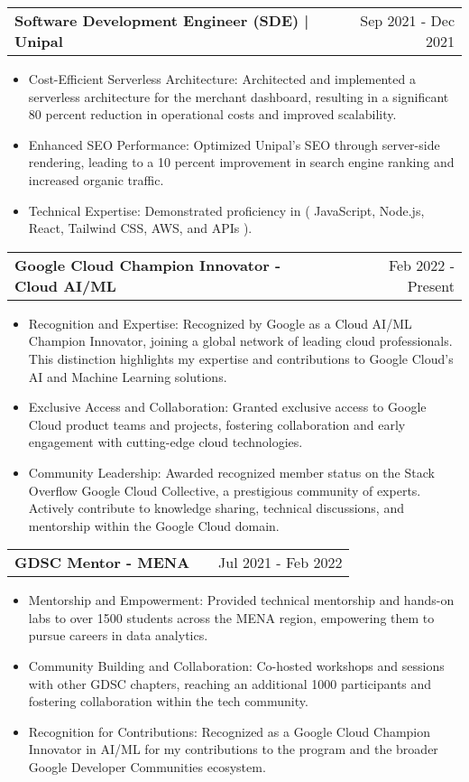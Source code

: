\documentclass[a4paper,11pt]{article}
\makeatletter
\newenvironment{joblong}[2]
    {
    \begin{tabularx}{\linewidth}{@{}l X r@{}}
    \textbf{#1} & \hfill &  #2 \\[3.75pt]
    \end{tabularx}
    \begin{minipage}[t]{\linewidth}
    \begin{itemize}[nosep,after=\strut, leftmargin=1em, itemsep=3pt,label=--]
    }
    {
    \end{itemize}
    \end{minipage}    
    }
\makeatother
\begin{document}
\begin{joblong}{Software Development Engineer (SDE) | Unipal}{Sep 2021 - Dec 2021}
    \item Cost-Efficient Serverless Architecture: Architected and implemented a serverless architecture for the merchant dashboard, resulting in a significant 80 percent reduction in operational costs and improved scalability.
    \item Enhanced SEO Performance: Optimized Unipal's SEO through server-side rendering, leading to a 10 percent improvement in search engine ranking and increased organic traffic.
    \item Technical Expertise: Demonstrated proficiency in ( JavaScript, Node.js, React, Tailwind CSS, AWS, and APIs ).

\end{joblong}

\begin{joblong}{Google Cloud Champion Innovator - Cloud AI/ML}{Feb 2022 - Present}
\item Recognition and Expertise: Recognized by Google as a Cloud AI/ML Champion Innovator, joining a global network of leading cloud professionals. This distinction highlights my expertise and contributions to Google Cloud's AI and Machine Learning solutions.
\item Exclusive Access and Collaboration: Granted exclusive access to Google Cloud product teams and projects, fostering collaboration and early engagement with cutting-edge cloud technologies.
\item Community Leadership: Awarded recognized member status on the Stack Overflow Google Cloud Collective, a prestigious community of experts. Actively contribute to knowledge sharing, technical discussions, and mentorship within the Google Cloud domain.

\end{joblong}

\begin{joblong}{GDSC Mentor - MENA}{Jul 2021 - Feb 2022}
\item Mentorship and Empowerment: Provided technical mentorship and hands-on labs to over 1500 students across the MENA region, empowering them to pursue careers in data analytics.
\item Community Building and Collaboration: Co-hosted workshops and sessions with other GDSC chapters, reaching an additional 1000 participants and fostering collaboration within the tech community.
\item Recognition for Contributions: Recognized as a Google Cloud Champion Innovator in AI/ML for my contributions to the program and the broader Google Developer Communities ecosystem.

\end{joblong}
\end{document}
